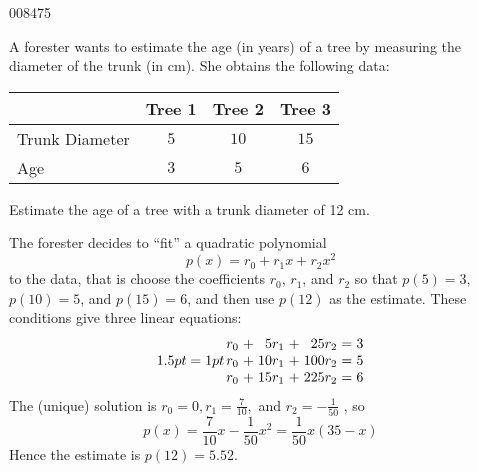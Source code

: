 \begin{example}{}{008475}
\begin{wrapfigure}[4]{l}{4.5cm}

\end{wrapfigure} 
A forester wants to estimate the age 
(in years) of a tree by measuring the diameter of the trunk (in cm). She
 obtains the following data:


\begin{center}
\hspace*{0cm}
\begin{tabu} to 15cm {|l|c|c|c|}
\hline
& Tree 1 & Tree 2 & Tree 3 \\ \hline
Trunk Diameter & $5$ & $10$ & $15$ \\
Age & $3$ & $5$ & $6$ \\
\hline
\end{tabu}
\end{center}



Estimate the age of a tree with a trunk diameter of 12 cm.

\begin{solution}

The forester decides to ``fit'' a quadratic polynomial
\begin{equation*}
p(x) = r_0 + r_1x + r_2x^2
\end{equation*}
to the data, that is choose the coefficients $r_{0}$, $r_{1}$, and $r_{2}$ so that $p(5) = 3$, $p(10) = 5$, and $p(15) = 6$, and then use $p(12)$ as the estimate. These conditions give three linear equations:
\begin{equation*}
\arraycolsep=1pt
\begin{array}{rrrrrrr}
 	 r_0 & + & 5r_1 & + & 25r_2  & = & 3\\
 	 r_0 & + & 10r_1 & + & 100r_2  & = & 5\\
 	 r_0 & + & 15r_1 & + & 225r_2  & = & 6
\end{array}
\end{equation*}
The (unique) solution is $r_0=0, r_1 = \frac{7}{10},$ and $r_2 = -\frac{1}{50}$
, so
\begin{equation*}
p(x) = \frac{7}{10}x - \frac{1}{50}x^2 = \frac{1}{50}x (35-x)
\end{equation*}
Hence the estimate is $p(12) = 5.52$.
\end{solution}
\end{example}


